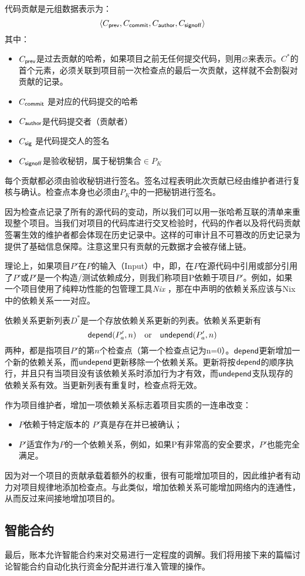 代码贡献是元组数据表示为：
\[
   \langle C_{\mathsf{prev}}, C_{\mathsf{commit}}, C_{\mathsf{author}}, C_{\mathsf{signoff}}\rangle
\]
其中：
\begin{itemize}
\item $C_{\mathsf{prev}}$是过去贡献的哈希，如果项目之前无任何提交代码，则用⌀来表示。$C^*$的首个元素，必须关联到项目前一次检查点的最后一次贡献，这样就不会割裂对贡献的记录。
\item $C_{\mathsf{commit}}$ 是对应的代码提交的哈希
\item $C_{\mathsf{author}}$是代码提交者（贡献者）
\item $C_{\mathsf{sig}}$ 是代码提交人的签名
\item $C_{\mathsf{signoff}}$是验收秘钥，属于秘钥集合$\in P_K$
\end{itemize}
每个贡献都必须由验收秘钥进行签名。签名过程表明此次贡献已经由维护者进行复核与确认。检查点本身也必须由$P_K$中的一把秘钥进行签名。

因为检查点记录了所有的源代码的变动，所以我们可以用一张哈希互联的清单来重现整个项目。当我们对项目的代码库进行交叉检验时，代码的作者以及将代码贡献签署生效的维护者都会体现在历史记录中。这样的可审计且不可篡改的历史记录为\osrank{}提供了基础信息保障。注意这里只有贡献的元数据才会被存储上链。

\label{s:dependencies}

理论上，如果项目$P'$在$P$的输入（Input）中，即，在$P$在源代码中引用或部分引用了$P'$或$P'$是一个构造/测试依赖成分，则我们称项目P依赖于项目$P'$。例如，如果一个项目使用了纯粹功性能的包管理工具\emph{Nix} \cite{nix}，那在\oscoin{}中声明的依赖关系应该与Nix中的依赖关系一一对应。

依赖关系更新列表$D^*$是一个存放依赖关系更新的列表。依赖关系更新有
\[
    \mathsf{depend}(P'_a, n) \quad \text{or} \quad \mathsf{undepend}(P'_a, n)
\]
两种，都是指项目$P'$的第$n$个检查点（第一个检查点记为n=$0$）。$\mathsf{depend}$更新增加一个新的依赖关系，而$\mathsf{undepend}$更新移除一个依赖关系。更新将按$\mathsf{depend}$的顺序执行，并且只有当项目没有该依赖关系时添加行为才有效，而$\mathsf{undepend}$支队现存的依赖关系有效。当更新列表有重复时，检查点将无效。

作为项目维护者，增加一项依赖关系标志着项目实质的一连串改变：
\begin{itemize}
\item $P$依赖于特定版本的 $P'$真是存在并已被确认；
\item $P'$适宜作为$P$的一个依赖关系，例如，如果P有非常高的安全要求，$P'$也能完全满足。
\end{itemize}
\noindent 因为对一个项目的贡献承载着额外的权重，很有可能增加项目的\osrank{}，因此维护者有动力对项目规律地添加检查点。与此类似，增加依赖关系可能增加网络内的连通性，从而反过来间接地增加项目的\osrank{}。

\subsection{智能合约}

最后，账本允许智能合约来对交易进行一定程度的调解。我们将用接下来的篇幅讨论智能合约自动化执行资金分配并进行准入管理的操作。